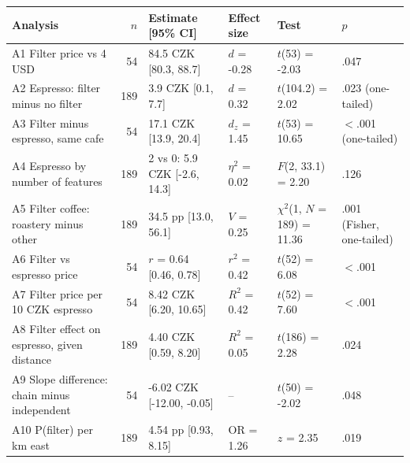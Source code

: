 \begin{tabular}{lrllll}
\toprule
Analysis & $n$ & Estimate [95\% CI] & Effect size & Test & $p$ \\
\midrule
A1 Filter price vs 4 USD & 54 & 84.5 CZK [80.3, 88.7] & $d$ = -0.28 & $t$(53) = -2.03 & .047 \\
A2 Espresso: filter minus no filter & 189 & 3.9 CZK [0.1, 7.7] & $d$ = 0.32 & $t$(104.2) = 2.02 & .023 (one-tailed) \\
A3 Filter minus espresso, same cafe & 54 & 17.1 CZK [13.9, 20.4] & $d_z$ = 1.45 & $t$(53) = 10.65 & $<$.001 (one-tailed) \\
A4 Espresso by number of features & 189 & 2 vs 0: 5.9 CZK [-2.6, 14.3] & $\eta^2$ = 0.02 & $F$(2, 33.1) = 2.20 & .126 \\
A5 Filter coffee: roastery minus other & 189 & 34.5 pp [13.0, 56.1] & $V$ = 0.25 & $\chi^2$(1, $N$ = 189) = 11.36 & .001 (Fisher, one-tailed) \\
A6 Filter vs espresso price & 54 & $r$ = 0.64 [0.46, 0.78] & $r^2$ = 0.42 & $t$(52) = 6.08 & $<$.001 \\
A7 Filter price per 10 CZK espresso & 54 & 8.42 CZK [6.20, 10.65] & $R^2$ = 0.42 & $t$(52) = 7.60 & $<$.001 \\
A8 Filter effect on espresso, given distance & 189 & 4.40 CZK [0.59, 8.20] & $R^2$ = 0.05 & $t$(186) = 2.28 & .024 \\
A9 Slope difference: chain minus independent & 54 & -6.02 CZK [-12.00, -0.05] & -- & $t$(50) = -2.02 & .048 \\
A10 P(filter) per km east & 189 & 4.54 pp [0.93, 8.15] & OR = 1.26 & $z$ = 2.35 & .019 \\
\bottomrule
\end{tabular}
